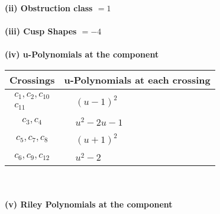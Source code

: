 \documentclass[1p]{elsarticle_modified}
\theoremstyle{definition}
\begin{document}
\flushleft \textbf{(ii) Obstruction class $= 1$}\\~\\
\flushleft \textbf{(iii) Cusp Shapes $= -4$}\\~\\
\newpage\renewcommand{\arraystretch}{1}
\flushleft \textbf{(iv) u-Polynomials at the component}\newline \\
\begin{tabular}{m{50pt}|m{274pt}}
Crossings & \hspace{64pt}u-Polynomials at each crossing \\
\hline $$\begin{aligned}c_{1},c_{2},c_{10}\\c_{11}\end{aligned}$$&$\begin{aligned}
&(u-1)^2
\end{aligned}$\\
\hline $$\begin{aligned}c_{3},c_{4}\end{aligned}$$&$\begin{aligned}
&u^2-2 u-1
\end{aligned}$\\
\hline $$\begin{aligned}c_{5},c_{7},c_{8}\end{aligned}$$&$\begin{aligned}
&(u+1)^2
\end{aligned}$\\
\hline $$\begin{aligned}c_{6},c_{9},c_{12}\end{aligned}$$&$\begin{aligned}
&u^2-2
\end{aligned}$\\
\hline
\end{tabular}\\~\\
\newpage\renewcommand{\arraystretch}{1}
\flushleft \textbf{(v) Riley Polynomials at the component}\newline \\
\end{document}
